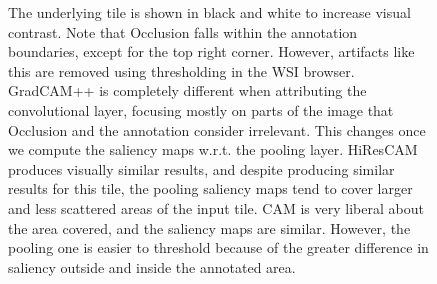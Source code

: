 \begin{figure}
\begin{center}
{    The underlying tile is shown in black and white to increase visual contrast.
    Note that Occlusion falls within the annotation boundaries, except for the top right corner.
    However, artifacts like this are removed using thresholding in the WSI browser.
    GradCAM++ is completely different when attributing the convolutional layer, focusing mostly on parts of the image that Occlusion and the annotation consider irrelevant.
    This changes once we compute the saliency maps w.r.t. the pooling layer.
    HiResCAM produces visually similar results, and despite producing similar results for this tile, the pooling saliency maps tend to cover larger and less scattered areas of the input tile.
    CAM is very liberal about the area covered, and the saliency maps are similar.
    However, the pooling one is easier to threshold because of the greater difference in saliency outside and inside the annotated area.
    }
    \label{fig:conv-vs-pool}
    \end{center}
\end{figure}

